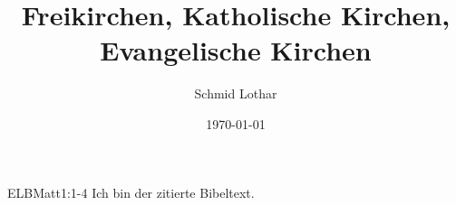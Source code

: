 \documentclass[a4paper, 12pt, twoside, titlepage,headsepline]{scrartcl}
\title{Freikirchen, Katholische Kirchen, Evangelische Kirchen}
\author{Schmid Lothar}
\date{\today}
\begin{document}
\maketitle[-1]


\begin{bibeltext}{ELB}{Matt}{1:1-4}
				Ich bin der zitierte Bibeltext.
\end{bibeltext}




\end{document}
